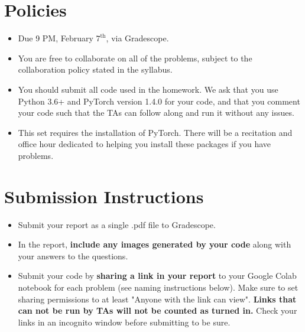 \newif\ifshowsolutions
\showsolutionstrue







\pagestyle{fancy}




\section*{Policies}
\begin{itemize}
  \item Due 9 PM, February $7^\text{th}$, via Gradescope.
  \item You are free to collaborate on all of the problems, subject to the collaboration policy stated in the syllabus.
  \item You should submit all code used in the homework. We ask that you use Python 3.6+ and PyTorch version 1.4.0 for your code, and that you comment your code such that the TAs can follow along and run it without any issues.
    \item This set requires the installation of PyTorch. There will be a recitation and office hour dedicated to helping you install these packages if you have problems.
\end{itemize}

\section*{Submission Instructions}
\begin{itemize}
  \item Submit your report as a single .pdf file to Gradescope.
  \item In the report, \textbf{include any images generated by your code} along with your answers to the questions.
  \item Submit your code by \textbf{sharing a link in your report} to your Google Colab notebook for each problem (see naming instructions below). Make sure to set sharing permissions to at least "Anyone with the link can view". \textbf{Links that can not be run by TAs will not be counted as turned in.} Check your links in an incognito window before submitting to be sure. 
\end{itemize}

